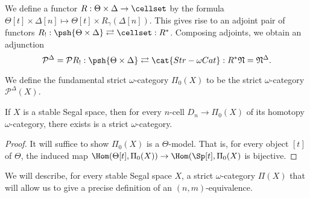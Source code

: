 \begin{defn}We define a functor \(R:\Theta\times \Delta\to \cellset\) by the formula \(\Theta[t]\times \Delta[n] \mapsto \Theta[t]\times R_\gamma(\Delta[n])\).  This gives rise to an adjoint pair of functors \(R_!:\psh{\Theta\times \Delta}\rightleftarrows \cellset:R^\ast\).  Composing adjoints, we obtain an adjunction \[\mathcal{P}^\Delta=\mathcal{P}R_!: \psh{\Theta\times \Delta} \rightleftarrows \cat{Str-\omega\-Cat}: R^\ast\mathfrak{N}=\mathfrak{N}^\Delta.\]
\end{defn}
\begin{defn}We define the fundamental strict \(\omega\)-category \(\Pi_0(X)\) to be the strict \(\omega\)-category \(\mathcal{P}^\Delta(X)\).  
\end{defn}
\begin{prop} 
If \(X\) is a stable Segal space, then for every \(n\)-cell \(D_n\to \Pi_0(X)\) of its homotopy \(\omega\)-category, there exists  is a strict \(\omega\)-category.  
\end{prop}
\begin{proof} It will suffice to show \(\Pi_0(X)\) is a \(\Theta\)-model.  That is, for every object \([t]\) of \(\Theta\), the induced map \(\Hom(\Theta[t],\Pi_0(X))\to \Hom(\Sp[t], \Pi_0(X)\) is bijective.  
\end{proof} 
We will describe, for every stable Segal space \(X\), a strict \(\omega\)-category \(\Pi(X)\) that will allow us to give a precise definition of an \((n,m)\)-equivalence. 





